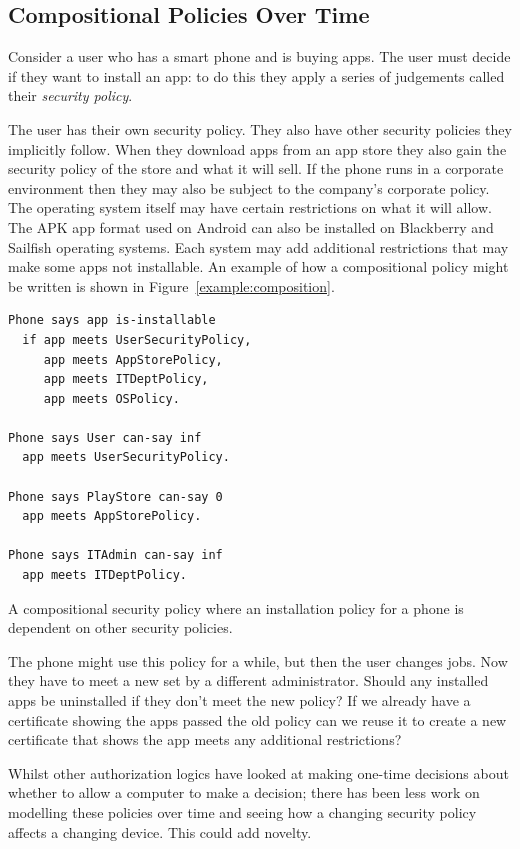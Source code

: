 \documentclass[a4paper,sfsidenotes]{tufte-book}
\begin{document}
\subsection{Compositional Policies Over Time}

Consider a user who has a smart phone and is buying apps.  The
user must decide if they want to install an app: to do this they apply a series
of judgements called their \emph{security policy}.  

The user has their own security policy. They also have other security policies
they implicitly follow.  When they download apps from an app store they also
gain the security policy of the store and what it will sell.  If the phone runs
in a corporate environment then they may also be subject to the company's
corporate policy.  The operating system itself may have certain restrictions on
what it will allow.  The APK app format used on Android can also be installed on
Blackberry and Sailfish operating systems.  Each system may add
additional restrictions that may make some apps not installable.  An example of
how a compositional policy might be written is shown in
Figure~\ref{example:composition}.

\begin{marginfigure}\label{example:composition}
  \begin{lstlisting}[language=SecPAL]
Phone says app is-installable
  if app meets UserSecurityPolicy,
     app meets AppStorePolicy,
     app meets ITDeptPolicy,
     app meets OSPolicy.

Phone says User can-say inf
  app meets UserSecurityPolicy.

Phone says PlayStore can-say 0
  app meets AppStorePolicy.

Phone says ITAdmin can-say inf
  app meets ITDeptPolicy.
  \end{lstlisting}
  \caption{A compositional security policy where an installation policy for a
    phone is dependent on other security policies.}
\end{marginfigure}
     
The phone might use this policy for a while, but then the user changes jobs.
Now they have to meet a new  set by a different administrator.
Should any installed apps be uninstalled if they don't meet the new policy?  If
we already have a certificate showing the apps passed the old policy can we
reuse it to create a new certificate that shows the app meets any additional
restrictions?

Whilst other authorization logics have looked at making one-time decisions about
whether to allow a computer to make a decision; there has been less work on
modelling these policies over time and seeing how a changing security policy
affects a changing device.  This could add novelty.
\end{document}
